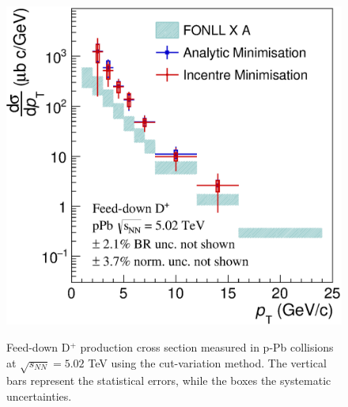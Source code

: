 \documentclass[b5paper,10pt,twoside,oldstyle,classica]{toptesi}
\begin{document}
\begin{figure}[tb]
\begin{center}
{\includegraphics[scale = 0.45]{CrossSectionFDpPb.eps}}
\caption{Feed-down D$^+$ production cross section measured in p-Pb collisions at $\sqrt{s_{NN}} = 5.02$ TeV using the cut-variation method. The vertical bars represent the statistical errors, while the boxes the systematic uncertainties.}
\label{cutvar_FD_cross}
\end{center}

\end{figure}
\end{document}
